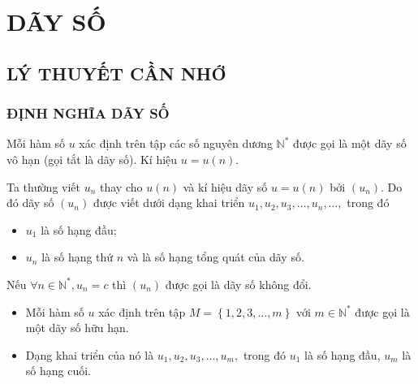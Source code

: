 \setcounter{dang}{0}

\section{DÃY SỐ}
\subsection{LÝ THUYẾT CẦN NHỚ}
\subsubsection{ĐỊNH NGHĨA DÃY SỐ}
\iconMT {} Mỗi hàm số $u$ xác định trên tập các số nguyên dương $\mathbb{N}^*$ được gọi là một dãy số vô hạn (gọi tắt là dãy số). Kí hiệu $u=u(n )$.
		\begin{listEX}[1]
			\item [\ding{172}] Ta thường viết $u_n$ thay cho $u(n)$ và kí hiệu dãy số $u=u(n)$ bởi $\left(u_n\right)$. Do đó dãy số $(u_n)$ được viết dưới dạng khai triển ${{u}_{1}},{{u}_{2}},{{u}_{3}},\ldots,{{u}_n},\ldots,$ trong đó
			\begin{itemize}
				\item [$\bullet$]  ${{u}_{1}}$ là số hạng đầu;
				\item [$\bullet$]  ${{u}_n}$ là số hạng thứ $n$ và là số hạng tổng quát của dãy số.
			\end{itemize}
			\item [\ding{173}] Nếu $\forall n \in \mathbb{N}^*, u_n=c$ thì $\left(u_n\right)$ được  gọi là dãy số không đổi.
		\end{listEX}
\iconMT {}
	\begin{itemize}
		\item [$\bullet$] Mỗi hàm số $u$ xác định trên tập $M=\left\{ 1,2,3,\ldots,m \right\}$ với $m\in \mathbb{N}^*$ được gọi là một dãy số hữu hạn.
		\item [$\bullet$]  Dạng khai triển của nó là ${{u}_{1}},{{u}_{2}},{{u}_{3}},\ldots,{{u}_m},$ trong đó ${{u}_{1}}$ là số hạng đầu, ${{u}_m}$ là số hạng cuối.
	\end{itemize}

